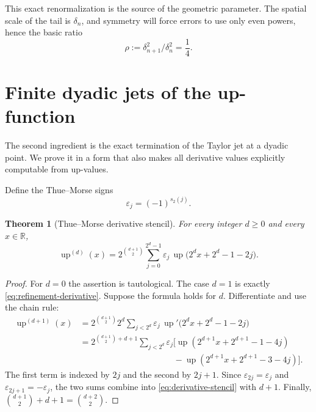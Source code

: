 \documentclass[11pt,a4paper]{article}
\newtheorem{theorem}{Theorem}[section]
\theoremstyle{remark}
\newcommand{\R}{\mathbb{R}}
\newcommand{\up}{\operatorname{up}}
\newcommand{\TM}{\varepsilon}
\begin{document}
This exact renormalization is the source of the geometric parameter.  The
spatial scale of the tail is $\delta_n$, and symmetry will force errors to use
only even powers, hence the basic ratio
\begin{equation}
 \rho:=\delta_{n+1}^2/\delta_n^2=\frac14.
 \label{eq:rho}
\end{equation}

\section{Finite dyadic jets of the up-function}
\label{sec:dyadic-jets}

The second ingredient is the exact termination of the Taylor jet at a dyadic
point.  We prove it in a form that also makes all derivative values explicitly
computable from up-values.

Define the Thue--Morse signs
\begin{equation}
 \TM_j=(-1)^{s_2(j)}.
 \label{eq:tm-sign}
\end{equation}

\begin{theorem}[Thue--Morse derivative stencil]
\label{thm:derivative-stencil}
For every integer $d\ge0$ and every $x\in\R$,
\begin{equation}
 \boxed{
 \up^{(d)}(x)=2^{\binom{d+1}{2}}
 \sum_{j=0}^{2^d-1}\TM_j\,
 \up\bigl(2^dx+2^d-1-2j\bigr). }
 \label{eq:derivative-stencil}
\end{equation}
\end{theorem}

\begin{proof}
For $d=0$ the assertion is tautological.  The case $d=1$ is exactly
\eqref{eq:refinement-derivative}.  Suppose the formula holds for $d$.
Differentiate and use the chain rule:
\begin{align*}
 \up^{(d+1)}(x)
 &=2^{\binom{d+1}{2}}2^d
   \sum_{j<2^d}\TM_j\,
   \up'\bigl(2^dx+2^d-1-2j\bigr)\\
 &=2^{\binom{d+1}{2}+d+1}
   \sum_{j<2^d}\TM_j
   \bigl[\up(2^{d+1}x+2^{d+1}-1-4j)\\
 &\hspace{11em}-\up(2^{d+1}x+2^{d+1}-3-4j)\bigr].
\end{align*}
The first term is indexed by $2j$ and the second by $2j+1$.
Since $\TM_{2j}=\TM_j$ and $\TM_{2j+1}=-\TM_j$, the two sums combine into
\eqref{eq:derivative-stencil} with $d+1$.  Finally,
$\binom{d+1}{2}+d+1=\binom{d+2}{2}$.
\end{proof}
\end{document}
